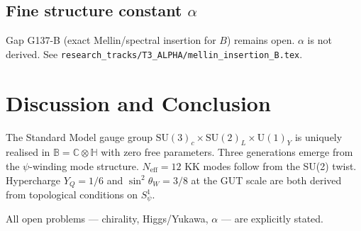 \documentclass[12pt,a4paper]{article}
\theoremstyle{definition}
\theoremstyle{remark}
\newcommand{\SU}[1]{\mathrm{SU}(#1)}
\newcommand{\UU}[1]{\mathrm{U}(#1)}
\newcommand{\Bq}{\mathbb{C}\otimes\mathbb{H}}
\begin{document}
\subsection*{Fine structure constant $\alpha$}

Gap G137-B (exact Mellin/spectral insertion for $B$) remains open.
$\alpha$ is not derived.
See \texttt{research\_tracks/T3\_ALPHA/mellin\_insertion\_B.tex}.

\section{Discussion and Conclusion}
\label{sec:conclusion}

The Standard Model gauge group $\SU{3}_c\times\SU{2}_L\times\UU{1}_Y$
is uniquely realised in $\mathbb{B} = \Bq$ with zero free parameters.
Three generations emerge from the $\psi$-winding mode structure.
$N_{\mathrm{eff}} = 12$ KK modes follow from the SU(2) twist.
Hypercharge $Y_Q = 1/6$ and $\sin^2\theta_W = 3/8$ at the GUT scale
are both derived from topological conditions on $S^1_\psi$.

All open problems — chirality, Higgs/Yukawa,
$\alpha$ — are explicitly stated.



\end{document}
